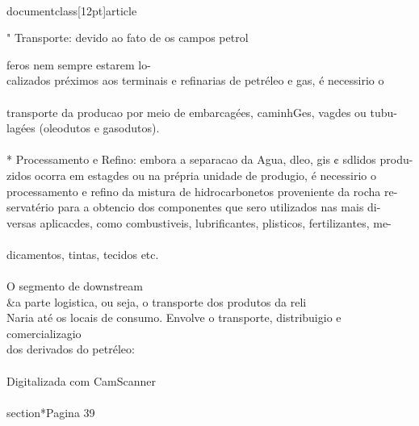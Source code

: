 \\documentclass[12pt]{article}
\begin{document}
" Transporte: devido ao fato de os campos petrol\\{feros nem sempre estarem lo-\\
calizados préximos aos terminais e refinarias de petréleo e gas, é necessirio o\\
\\
transporte da producao por meio de embarcagées, caminhGes, vagdes ou tubu-\\
lagées (oleodutos e gasodutos).\\
\\
* Processamento e Refino: embora a separacao da Agua, dleo, gis ¢ sdlidos produ-\\
zidos ocorra em estagdes ou na prépria unidade de produgio, é necessirio o\\
processamento e refino da mistura de hidrocarbonetos proveniente da rocha re-\\
servatério para a obtencio dos componentes que sero utilizados nas mais di-\\
versas aplicacdes, como combustiveis, lubrificantes, plisticos, fertilizantes, me-\\
\\
dicamentos, tintas, tecidos etc.\\
\\
O segmento de downstream \\&a parte logistica, ou seja, o transporte dos produtos da reli\\
Naria até os locais de consumo. Envolve o transporte, distribuigio e comercializagio\\
dos derivados do petréleo:\\
\\
Digitalizada com CamScanner\\

\\section*{Pagina 39}

}
\end{document}
